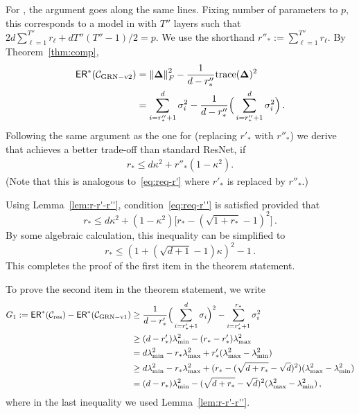For \GenB{}, the argument goes along the same lines. Fixing number of parameters to $p$, this corresponds to a model in \GenB{} with $T''$ layers such that $2d\sum_{\ell=1}^{T''}r_{\ell}+dT''(T''-1)/2 = p$. We use the shorthand $r''_*:= \sum_{\ell=1}^{T''}r_\ell$. By Theorem~\ref{thm:comp}, 
\begin{align*}
{\sf ER}^*(\mathcal{C}_{\rm GRN-v2{}}) 
&= \left\|\bm{\Delta}\right\|_{F}^2 - \frac{1}{d-r''_*}{{\operatorname{trace}}}(\bm{\Delta})^2\\
& = \sum_{i=r''_*+1}^d \sigma_i^2 - \frac{1}{d-r''_*}\Big(\sum_{i=r''_*+1}^d \sigma_i^2 \Big)\,.
\end{align*}
Following the same argument as the one for \GenA{} (replacing $r'_*$ with $r''_*$) we derive that \GenB{} achieves a better trade-off than standard ResNet, if
\begin{align}\label{eq:req-r''}
r_*\le d\kappa^2+r''_*(1-\kappa^2).
\end{align}
(Note that this is analogous to~\eqref{eq:req-r'} where $r'_*$ is replaced by $r''_*$.)

Using Lemma~\ref{lem:r-r'-r''}, condition~\ref{eq:req-r''} is satisfied provided that
\[
r_*\le d\kappa^2 + (1-\kappa^2) \Big[r_* - (\sqrt{1+r_*} - 1)^2 \Big]\,.
\]
By some algebraic calculation, this inequality can be simplified to
\[
r_*\le (1+(\sqrt{d+1}-1)\kappa)^2-1\,.
\]
This completes the proof of the first item in the theorem statement.

To prove the second item in the theorem statement, we write
\begin{align*}
G_1: ={\sf ER}^*(\mathcal{C}_{\rm res}) - {\sf ER}^*(\mathcal{C}_{\rm GRN-v1{}}) &\ge 
 \frac{1}{d-r'_*} \Big(\sum_{i=r'_*+1}^d \sigma_i \Big)^2 -\sum_{i=r'_*+1}^{r_*} \sigma_i^2\\
 & \ge (d-r'_*)\lambda_{\min}^2 - (r_*-r'_*)\lambda_{\max}^2\\
 & = d\lambda_{\min}^2 - r_* \lambda_{\max}^2 +r'_*(\lambda_{\max}^2- \lambda_{\min}^2)\\
 &\ge d\lambda_{\min}^2 - r_* \lambda_{\max}^2 + (r_* - (\sqrt{d+r_*}-\sqrt{d})^2)(\lambda_{\max}^2- \lambda_{\min}^2)\\
 &= (d-r_*)\lambda_{\min}^2 - (\sqrt{d+r_*}-\sqrt{d})^2(\lambda_{\max}^2- \lambda_{\min}^2)\,,
\end{align*}
where in the last inequality we used Lemma~\ref{lem:r-r'-r''}.

